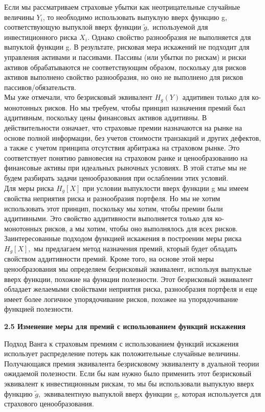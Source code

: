 \documentclass[12pt,a4paper]{article}
\begin{document}
Если мы рассматриваем страховые убытки как неотрицательные случайные величины $Y_i$, то необходимо использовать выпуклую вверх функцию g, соответствующую выпуклой вверх функции ${\tilde g},$ используемой для инвестиционного риска $X_i.$ Однако свойство разнообразия не выполняется для выпуклой функции g. В результате,  рисковая мера искажений  не подходит для управления активами и пассивами. Пассивы (или убытки по рискам) и риски  активов обрабатываются не  соответствующим образом, поскольку для рисков  активов  выполнено свойство разнообразия, но оно не выполнено для рисков пассивов/обязательств. \\

 Мы уже отмечали, что безрисковый эквивалент  $ H_{g}(Y) $ аддитивен только для ко-монотонных рисков. Но мы требуем, чтобы принцип назначения премий был аддитивным, поскольку цены финансовых активов аддитивны.  В действительности означает, что страховые премии назначаются на рынке  на основе полной информации, без учетов стоимости транзакций и других дефектов, а также с учетом принципа отсутствия арбитража на страховом рынке. Это соответствует понятию равновесия на страховом ранке и ценообразованию на финансовые активы при идеальных рыночных условиях. В этой статье мы не будем разбирать задачи ценообразования при ослаблении этих условий.\\
 
 Для меры риска   $ H_{g} \left[ X \right]  $ при условии выпуклости вверх функции g мы имеем свойства неприятия риска и разнообразия портфеля. Но мы не хотим использовать этот принцип, поскольку мы хотим, чтобы премии были аддитивными. Это свойство аддитивности выполняется только для ко-монотонных рисков, а мы хотим, чтобы оно выполнялось для всех рисков. \\
 
Заинтересованные подходом функцией искажения  в построении  меры риска $ H_{g} \left[ X \right]  ,$ мы предлагаем метод назначения премий, кторый будет обладать свойством аддитивности премий. Кроме того, на основе этой меры ценообразования мы определяем безрисковый эквивалент, используя выпуклые вверх функции, похожие на функции полезности. Этот безрисковый эквивалент обладает желаемыми свойствами неприятия риска, разнообразия портфеля и еще имеет более логичное упорядочивание рисков, похожее на упорядочивание функцией полезности.


{\bf  2.5 Изменение меры для премий с использованием функций искажения }

Подход  Ванга к страховым премиям  с использованием функций искажения  использует распределение потерь как положительные случайные величины. Получающаяся премия эквивалента безрисковому эквиваленту в дуальной теории ожидаемой полезности.  Если бы нам нужно было применить этот безрисковый эквивалент к инвестиционным рискам, то мы бы использовали выпуклую вверх функцию $\tilde g,$  эквивалентную выпуклой вверх функции g, которая используется для страхового ценообразования.\\
\end{document}
